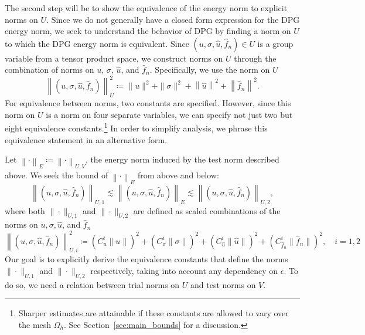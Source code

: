 \documentclass[11pt,onecolumn]{scrartcl}
\newcommand{\eqnlab}[1]{\label{eq:#1}}
\newcommand{\nor}[1]{\left\| #1 \right\|}
\newcommand{\Oh}{\Omega_h}
\begin{document}
The second step will be to show the equivalence of the energy norm to explicit norms on $U$. Since we do not generally have a closed form expression for the DPG energy norm, we seek to understand the behavior of DPG by finding a norm on $U$ to which the DPG energy norm is equivalent. Since $\left(u,\sigma,\widehat{u},\widehat{f}_n\right)\in U$ is a group variable from a tensor product space, we construct norms on $U$ through the combination of norms on $u$, $\sigma$, $\widehat{u}$, and $\widehat{f}_n$. Specifically, we use the norm on $U$ 
\begin{equation}
\left\| \left(u,\sigma,\widehat{u},\widehat{f}_n\right)\right \|_{U}^2 \coloneqq \|u\|^2 + \|\sigma\|^2 + \left\|\widehat{u}\right\|^2 + \left\|\widehat{f}_n\right\|^2.
\end{equation}
For equivalence between norms, two constants are specified. However, since this norm on $U$ is a norm on four separate variables, we can specify not just two but eight equivalence constants.\footnote{Sharper estimates are attainable if these constants are allowed to vary over the mesh $\Oh$. See Section~\ref{sec:main_bounds} for a discussion.} In order to simplify analysis, we phrase this equivalence statement in an alternative form. 

Let $\nor{\cdot}_E \coloneqq \nor{\cdot}_{U,V}$, the energy norm induced by the test norm described above. We seek the bound of $\nor{\cdot}_E$ from above and below:
\[
\left\| \left(u,\sigma,\widehat{u},\widehat{f}_n\right)\right \|_{U,1} \lesssim  \left\| \left(u,\sigma,\widehat{u},\widehat{f}_n\right)\right \|_E \lesssim \left\| \left(u,\sigma,\widehat{u},\widehat{f}_n\right)\right \|_{U,2},
\]
where both $\|\cdot\|_{U,1}$ and $\|\cdot\|_{U,2}$ are defined as scaled combinations of the norms on $u, \sigma, \widehat{u}$, and $\widehat{f}_n$
\begin{equation}
\eqnlab{uNorms}
\left\| \left(u,\sigma,\widehat{u},\widehat{f}_n\right)\right \|_{U,i}^2 \coloneqq \left(C_u^i\|u\|\right)^2 + \left(C_\sigma^i\|\sigma\|\right)^2 + \left(C_{\widehat{u}}^i\|\widehat{u}\|\right)^2 + \left(C_{\widehat{f}_n}^i\|\widehat{f}_n\|\right)^2,\quad i = 1,2
\end{equation}
Our goal is to explicitly derive the equivalence constants 
that define the norms $\|\cdot\|_{U,1}$ and $\|\cdot\|_{U,2}$ respectively, taking into account any dependency on $\epsilon$. To do so, we need a relation between trial norms on $U$ and test norms on $V$.
\end{document}
